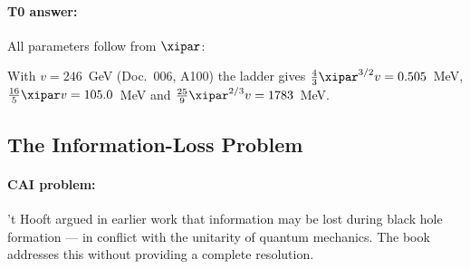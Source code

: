 \paragraph{T0 answer:} All parameters follow from $\xipar$:
\begin{table}[h]
    \centering
    \caption{Free parameters of the Standard Model in T0}
    \label{tab:sm_parameters}
\end{table}
With $v = 246$~GeV (Doc.~006, A100) the ladder gives $\tfrac43\xipar^{3/2}v = 0.505$~MeV,
$\tfrac{16}{5}\xipar v = 105.0$~MeV and $\tfrac{25}{9}\xipar^{2/3}v = 1783$~MeV.

\subsection{The Information-Loss Problem}

\paragraph{CAI problem:} 't Hooft argued in earlier work that information may be
lost during black hole formation — in conflict with the unitarity of quantum
mechanics. The book addresses this without providing a complete resolution.

